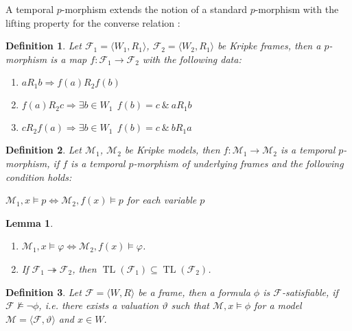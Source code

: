 \documentclass[a4paper]{article}
\theoremstyle{defin}
\newtheorem{defin}{Definition}
\theoremstyle{theorem}
\theoremstyle{prop}
\theoremstyle{lemma}
\newtheorem{lemma}{Lemma}
\theoremstyle{ex}
\theoremstyle{col}
\begin{document}
A temporal $p$-morphism extends the notion of a standard $p$-morphism with the lifting property for the converse relation \cite{Goldblatt}:

\begin{defin}
  Let $\mathcal{F}_1 = \langle W_1, R_1\rangle$, $\mathcal{F}_2 = \langle W_2, R_1 \rangle$ be Kripke frames, then a $p$-morphism is a map $f : \mathcal{F}_1 \to \mathcal{F}_2$ with the following data:
  \begin{enumerate}
    \item $a R_1 b \Rightarrow f(a) R_2 f(b)$
    \item $f(a) R_2 c \Rightarrow \exists b \in W_1 \:\: f(b) = c \: \& \: a R_1 b$
    \item $c R_2 f(a) \Rightarrow \exists b \in W_1 \:\: f(b) = c \: \& \: b R_1 a$
  \end{enumerate}
\end{defin}

\begin{defin}
  Let $\mathcal{M}_1$, $\mathcal{M}_2$ be Kripke models, then $f: \mathcal{M}_1 \to \mathcal{M}_2$ is a temporal $p$-morphism, if $f$ is a temporal $p$-morphism of underlying frames and the following condition holds:

  \begin{center}
    $\mathcal{M}_1, x \models p \Leftrightarrow \mathcal{M}_2, f(x) \models p$ for each variable $p$
  \end{center}
\end{defin}

\begin{lemma}
  $ $

  \begin{enumerate}
    \item $\mathcal{M}_1, x \models \varphi \Leftrightarrow \mathcal{M}_2, f(x) \models \varphi$.
    \item If $\mathcal{F}_1 \twoheadrightarrow \mathcal{F}_2$, then $\operatorname{TL}(\mathcal{F}_1) \subseteq \operatorname{TL}(\mathcal{F}_2)$.
  \end{enumerate}
\end{lemma}

\begin{defin}
  Let $\mathcal{F} = \langle W, R \rangle$ be a frame, then a formula $\phi$ is $\mathcal{F}$-satisfiable, if $\mathcal{F} \nvDash \neg \phi$, i.e. there exists a valuation $\vartheta$ such that $\mathcal{M}, x \models \phi$ for a model $\mathcal{M} = \langle \mathcal{F}, \vartheta \rangle$ and $x \in W$.
\end{defin}
\end{document}
